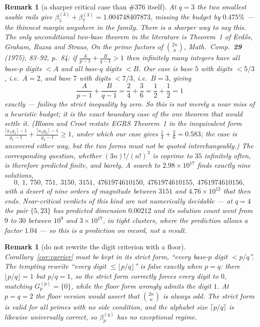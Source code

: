\documentclass[11pt]{article}
\newtheorem{remark}[theorem]{Remark}
\begin{document}
\begin{remark}[a sharper critical case than \#376 itself]\label{rem:q3crit}
At $q=3$ the two smallest usable rails give
$\beta_5^{(3)}+\beta_7^{(3)}=1.004748407873$, missing the budget by $0.475\%$ --- the thinnest
margin anywhere in the family.  There is a sharper way to say this.  The only unconditional
two-base theorem in the literature is Theorem~1 of Erd\H{o}s, Graham, Ruzsa and Straus,
\emph{On the prime factors of $\binom{2n}{n}$}, Math.\ Comp.\ \textbf{29} (1975), 83--92, p.~84:
if $\tfrac{A}{p-1}+\tfrac{B}{q-1}>1$ then infinitely many integers have all base-$p$ digits
$<A$ and all base-$q$ digits $<B$.  Our case is base $5$ with digits $<5/3$, i.e.\ $A=2$, and
base $7$ with digits $<7/3$, i.e.\ $B=3$, giving
\[
  \frac{A}{p-1}+\frac{B}{q-1}=\frac24+\frac36=\frac12+\frac12=1
\]
\emph{exactly} --- failing the strict inequality by zero.  So this is not merely a near miss of
a heuristic budget; it is the exact boundary case of the one theorem that would settle it.
(Bloom and Croot restate EGRS Theorem~1 in the inequivalent form
$\tfrac{\lceil\kappa_1g_1\rceil-1}{g_1-1}+\tfrac{\lceil\kappa_2g_2\rceil-1}{g_2-1}\ge1$, under
which our case gives $\tfrac14+\tfrac26=0.583$; the case is uncovered either way, but the two
forms must not be quoted interchangeably.)  The corresponding question, whether $(3n)!/(n!)^{3}$ is coprime
to $35$ infinitely often, is therefore predicted \emph{finite}, and barely.  A search to
$2.98\times10^{17}$ finds exactly nine solutions,
\[
  0,\ 1,\ 750,\ 751,\ 3150,\ 3151,\ 4761974610150,\ 4761974610155,\ 4761974610156,
\]
with a desert of nine orders of magnitude between $3151$ and $4.76\times10^{12}$ that then
ends.  Near-critical verdicts of this kind are not numerically decidable --- at $q=4$ the pair
$\{5,23\}$ has predicted dimension $0.00212$ and its solution count went from $9$ to $30$
between $10^{9}$ and $3\times10^{17}$, in tight clusters, where the prediction allows a factor
$1.04$ --- so this is a prediction on record, not a result.
\end{remark}

\begin{remark}[do not rewrite the digit criterion with a floor]\label{rem:floor}
Corollary~\ref{cor:carrier} must be kept in its strict form, ``every base-$p$ digit
$<p/q$''.  The tempting rewrite ``every digit $\le\lfloor p/q\rfloor$'' is false exactly when
$p=q$: there $\lfloor p/q\rfloor=1$ but $p/q=1$, so the strict form correctly forces every
digit to $0$, matching $G_p^{(p)}=\{0\}$, while the floor form wrongly admits the digit $1$.
At $p=q=2$ the floor version would assert that $\binom{2n}{n}$ is always odd.  The strict form
is valid for \emph{all} primes with no side condition, and the alphabet size $\lceil p/q\rceil$
is likewise universally correct, so $\beta_p^{(q)}$ has no exceptional regime.
\end{remark}
\end{document}
